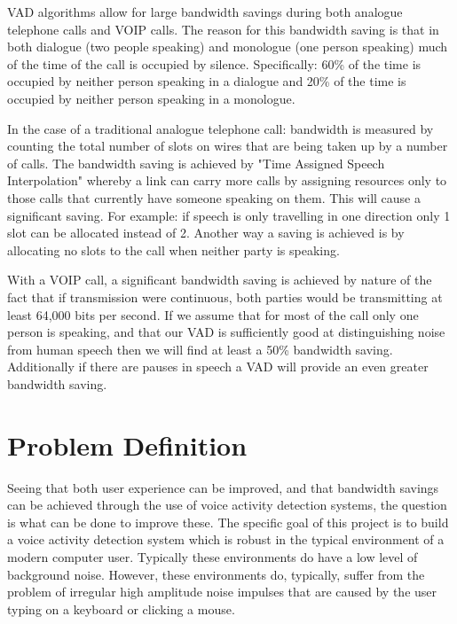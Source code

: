 \documentclass[ %
                    author={Sam Phippen},
                supervisor={Dr. Rafal Bogacz},
                     title={Real time voice activity detectors in noisy personal computing environments},
                  subtitle={},
                    degree={MEng},
                      year={2012} ]{thesis}
\begin{document}
VAD algorithms allow for large bandwidth savings during both analogue
telephone calls and VOIP calls. The reason for this bandwidth saving is that in
both dialogue (two people speaking) and monologue (one person speaking) much of
the time of the call is occupied by silence. Specifically: 60\% of the time is
occupied by neither person speaking\cite{shah} in a dialogue and 20\% of the
time is occupied by neither person speaking in a monologue.

In the case of a traditional analogue telephone call: bandwidth is measured by
counting the total number of slots on wires that are being taken up by a number
of calls. The bandwidth saving is achieved by "Time Assigned Speech
Interpolation" whereby a link can carry more calls by assigning resources only
to those calls that currently have someone speaking on them. This will cause a
significant saving. For example: if speech is only travelling in one direction
only 1 slot can be allocated instead of 2. Another way a saving is achieved is
by allocating no slots to the call when neither party is
speaking\cite{5016247}.

With a VOIP call, a significant bandwidth saving is achieved by nature of the
fact that if transmission were continuous, both parties would be transmitting
at least 64,000 bits per second\cite{ciscovad}. If we assume that for most of
the call only one person is speaking, and that our VAD is sufficiently good at
distinguishing noise from human speech then we will find at least a 50\%
bandwidth saving. Additionally if there are pauses in speech a VAD will
provide an even greater bandwidth saving.


\section{Problem Definition}

Seeing that both user experience can be improved, and that bandwidth savings
can be achieved through the use of voice activity detection systems, the
question is what can be done to improve these. The specific goal of this
project is to build a voice activity detection system which is robust in the
typical environment of a modern computer user. Typically these environments do
have a low level of background noise. However, these environments do,
typically, suffer from the problem of irregular high amplitude noise impulses
that are caused by the user typing on a keyboard or clicking a mouse.
\end{document}
